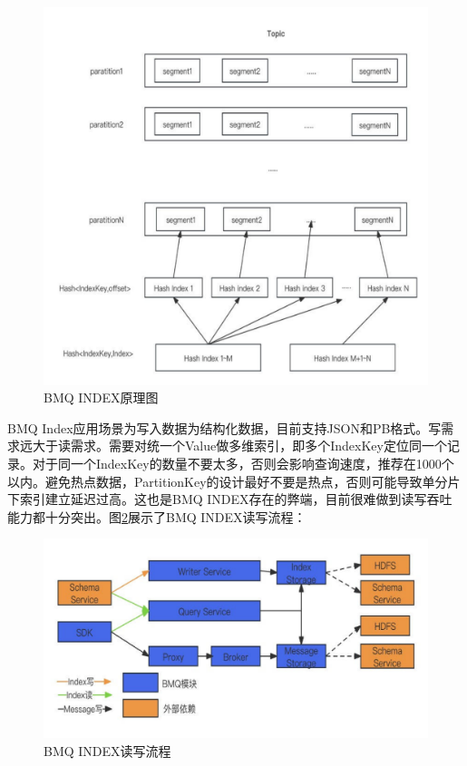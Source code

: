\begin{figure}[htb]
  \centering
  \includegraphics[width=5in]{figure/chapter2/BMQINDEX原理图.pdf}
  \caption{BMQ INDEX原理图}\label{bmqindexyuanli}
\end{figure}
BMQ Index应用场景为写入数据为结构化数据，目前支持JSON和PB格式。写需求远大于读需求。需要对统一个Value做多维索引，即多个IndexKey定位同一个记录。对于同一个IndexKey的数量不要太多，否则会影响查询速度，推荐在1000个以内。避免热点数据，PartitionKey的设计最好不要是热点，否则可能导致单分片下索引建立延迟过高。这也是BMQ INDEX存在的弊端，目前很难做到读写吞吐能力都十分突出。图\ref{bmqindexreadandwrite}展示了BMQ INDEX读写流程：
\begin{figure}[htb]
  \centering
  \includegraphics[width=5in]{figure/chapter2/BMQINDEX读写流程.pdf}
  \caption{BMQ INDEX读写流程}\label{bmqindexreadandwrite}
\end{figure}
